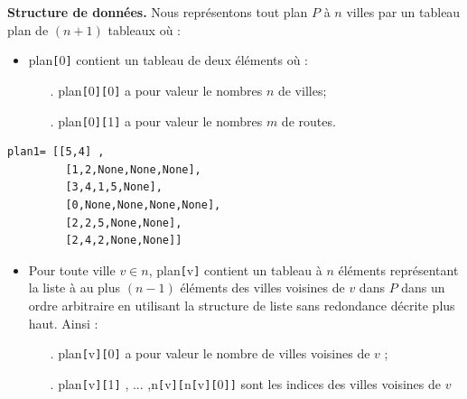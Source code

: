 \medskip
\begin{minipage}[c]{0.48\linewidth}
\textbf{Structure de données. } Nous représentons tout plan $P$ à $n$ villes par un tableau plan de $(n+1)$ tableaux où :
\begin{itemize}
\item plan\verb![!0\verb!]! contient un tableau de deux éléments où :
\begin{itemize}
\item[.] plan\verb![!0\verb!]!\verb![!0\verb!]! a pour valeur le nombres $n$ de villes;
\item[.] plan\verb![!0\verb!]!\verb![!1\verb!]! a pour valeur le nombres $m$ de routes.
\end{itemize}
\end{itemize}
\end{minipage}
\hfill%
\begin{minipage}[c]{0.48\linewidth}
\begin{lstlisting}
plan1= [[5,4] ,
         [1,2,None,None,None],
         [3,4,1,5,None],
         [0,None,None,None,None],
         [2,2,5,None,None],
         [2,4,2,None,None]]
\end{lstlisting}
\end{minipage}

\begin{itemize}
\item Pour toute ville $v \in n$, plan\verb![!v\verb!]! contient un tableau à $n$ éléments représentant 
la liste à au plus $(n-1)$ éléments des villes voisines de $v$ dans $P$ dans un ordre arbitraire en utilisant
la structure de liste sans redondance décrite plus haut. Ainsi :
\begin{itemize}
\item[.] plan\verb![!v\verb!]!\verb![!0\verb!]! a pour valeur le nombre de villes voisines de $v$ ;
\item[.] plan\verb![!v\verb!]!\verb![!1\verb!]! , ... ,n\verb![!v\verb!]!\verb![!n\verb![!v\verb!]!\verb![!0\verb!]!\verb!]! sont les indices des villes voisines de $v$
\end{itemize}
\end{itemize}

